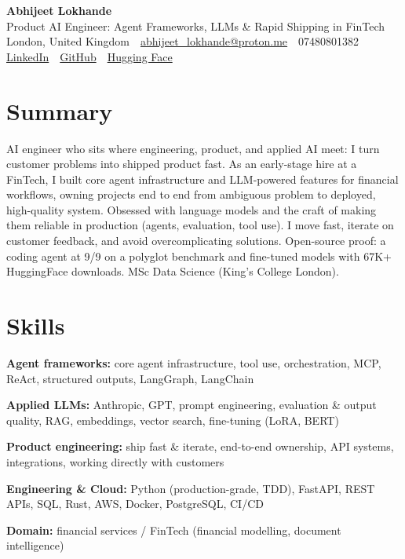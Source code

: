 \documentclass[10pt,a4paper]{article}
\newcommand{\sep}{\,\textcolor{accent!60}{\textbar}\,}
\begin{document}
\begin{center}
  {\fontsize{24}{26}\selectfont\bfseries Abhijeet Lokhande}\\[3pt]
  {\color{accent}\large Product AI Engineer: Agent Frameworks, LLMs \& Rapid Shipping in FinTech}\\[5pt]
  {\small
    London, United Kingdom \sep
    \href{mailto:abhijeet_lokhande@proton.me}{abhijeet\_lokhande@proton.me} \sep
    07480801382 \\[2pt]
    \href{https://www.linkedin.com/in/ablds/}{LinkedIn} \sep
    \href{https://github.com/abhijeetscode}{GitHub} \sep
    \href{https://huggingface.co/ab-ai}{Hugging Face}
  }
\end{center}
\vspace{2pt}

\section{Summary}
AI engineer who sits where engineering, product, and applied AI meet: I turn customer problems into shipped product fast. As an early-stage hire at a FinTech, I built core agent infrastructure and LLM-powered features for financial workflows, owning projects end to end from ambiguous problem to deployed, high-quality system. Obsessed with language models and the craft of making them reliable in production (agents, evaluation, tool use). I move fast, iterate on customer feedback, and avoid overcomplicating solutions. Open-source proof: a coding agent at 9/9 on a polyglot benchmark and fine-tuned models with 67K+ HuggingFace downloads. MSc Data Science (King's College London).

\section{Skills}
\begin{tight}
  \item[\textcolor{accent}{\small$\bullet$}] \textbf{Agent frameworks:} core agent infrastructure, tool use, orchestration, MCP, ReAct, structured outputs, LangGraph, LangChain
  \item[\textcolor{accent}{\small$\bullet$}] \textbf{Applied LLMs:} Anthropic, GPT, prompt engineering, evaluation \& output quality, RAG, embeddings, vector search, fine-tuning (LoRA, BERT)
  \item[\textcolor{accent}{\small$\bullet$}] \textbf{Product engineering:} ship fast \& iterate, end-to-end ownership, API systems, integrations, working directly with customers
  \item[\textcolor{accent}{\small$\bullet$}] \textbf{Engineering \& Cloud:} Python (production-grade, TDD), FastAPI, REST APIs, SQL, Rust, AWS, Docker, PostgreSQL, CI/CD
  \item[\textcolor{accent}{\small$\bullet$}] \textbf{Domain:} financial services / FinTech (financial modelling, document intelligence)
\end{tight}
\end{document}
